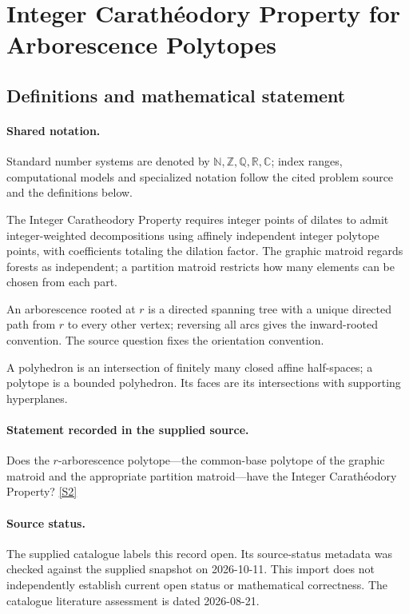 \documentclass[11pt]{article}
\newcommand{\sref}[2]{\hyperlink{source:#1:#2}{[S#2]}}
\begin{document}
\section{Integer Carathéodory Property for Arborescence Polytopes}\label{statement}

\subsection{Definitions and mathematical statement}

\paragraph{Shared notation.}Standard number systems are denoted by $\mathbb N,\mathbb Z,\mathbb Q,\mathbb R,\mathbb C$; index ranges, computational models and specialized notation follow the cited problem source and the definitions below.


The Integer Caratheodory Property requires integer points of dilates to admit integer-weighted decompositions using affinely independent integer polytope points, with coefficients totaling the dilation factor. The graphic matroid regards forests as independent; a partition matroid restricts how many elements can be chosen from each part.

An arborescence rooted at $r$ is a directed spanning tree with a unique directed path from $r$ to every other vertex; reversing all arcs gives the inward-rooted convention. The source question fixes the orientation convention.

A polyhedron is an intersection of finitely many closed affine half-spaces; a polytope is a bounded polyhedron. Its faces are its intersections with supporting hyperplanes.
\paragraph{Statement recorded in the supplied source.}
Does the $r$-arborescence polytope—the common-base polytope of the graphic matroid and the appropriate partition matroid—have the Integer Carathéodory Property? \sref{statement}{2}
\paragraph{Source status.}
The supplied catalogue labels this record open. Its source-status metadata was checked against the supplied snapshot on 2026-10-11. This import does not independently establish current open status or mathematical correctness. The catalogue literature assessment is dated 2026-08-21.
\end{document}
